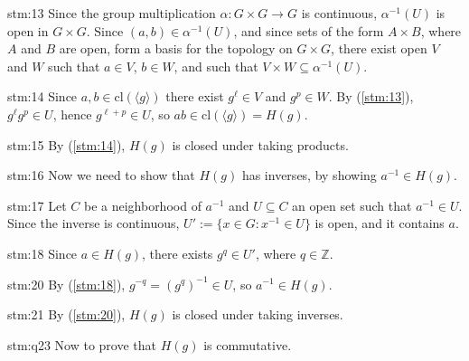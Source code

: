 \begin{statement}{stm:13}
Since the group multiplication $\alpha: G \times G \to G$ is continuous, $\alpha^{-1}(U)$ is open in $G \times G$. Since $(a,b) \in \alpha^{-1}(U)$, and since sets of the form $A \times B$, where $A$ and $B$ are open, form a basis for the topology on $G \times G$, there exist open $V$ and $W$ such that $a \in V$, $b \in W$, and such that $V \times W \subseteq \alpha^{-1}(U)$.
\end{statement}

\begin{statement}{stm:14}
Since $a,b \in \mathrm{cl}({\langle g \rangle})$ there exist $g^\ell \in V$ and $g^p \in W$. By (\ref{stm:13}), $g^\ell g^p \in U$, hence $g^{\ell+p} \in U$, so $ab \in \mathrm{cl}({\langle g \rangle}) = H(g)$.
\end{statement}

\begin{statement}{stm:15}
By (\ref{stm:14}), $H(g)$ is closed under taking products.
\end{statement}

\begin{explanation}{stm:16}
Now we need to show that $H(g)$ has inverses, by showing $a^{-1} \in H(g)$.
\end{explanation}

\begin{statement}{stm:17}
Let $C$ be a neighborhood of $a^{-1}$ and $U \subseteq C$ an open set such that $a^{-1} \in U$. Since the inverse is continuous, $U' := \{x \in G : x^{-1} \in U\}$ is open, and it contains $a$.
\end{statement}

\begin{statement}{stm:18}
Since $a \in H(g)$, there exists $g^q \in U'$, where $q \in \mathbb{Z}$.
\end{statement}

\begin{statement}{stm:20}
By (\ref{stm:18}), $g^{-q} = (g^q)^{-1} \in U$, so $a^{-1} \in H(g)$.
\end{statement}

\begin{statement}{stm:21}
By (\ref{stm:20}), $H(g)$ is closed under taking inverses.
\end{statement}

\begin{explanation}{stm:q23}
Now to prove that $H(g)$ is commutative.
\end{explanation}

